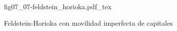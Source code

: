 \begin{figure}[h]
\centering
\def\svgwidth{0.5\textwidth}
{fig07_07-feldstein_horioka.pdf_tex}
\caption{Feldstein-Horioka con movilidad imperfecta de capitales}
\label{fig07_07-feldstein_horioka}
\end{figure}